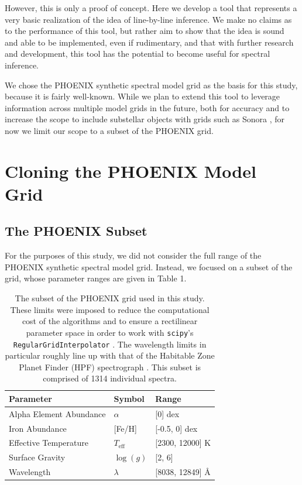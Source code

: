 \documentclass[twocolumn]{aastex631}
\begin{document}
However, this is only a proof of concept. Here we develop a tool that 
represents a very basic realization of the idea of line-by-line inference. 
We make no claims as to the performance of this tool, but rather aim to show 
that the idea is sound and able to be implemented, even if rudimentary, and 
that with further research and development, this tool has the potential to 
become useful for spectral inference.

We chose the PHOENIX synthetic spectral model grid as the basis for this 
study, because it is fairly well-known. While we plan to extend this tool to 
leverage information across multiple model grids in the future, both for 
accuracy and to increase the scope to include substellar objects with grids
such as Sonora \citep{bobcat, cholla, diamondback, elfowl}, for now we limit our scope to a subset of the PHOENIX grid.

\section{Cloning the PHOENIX Model Grid}
\subsection{The PHOENIX Subset}
For the purposes of this study, we did not consider the full range of the
PHOENIX synthetic spectral model grid. Instead, we focused on a subset of 
the grid, whose parameter ranges are given in Table 1.

\begin{table}[h!]
    \centering
    \begin{tabular}{lll}
        \hline
        \bf{Parameter} & \bf{Symbol} & \bf{Range}\\
        \hline
        Alpha Element Abundance & $\alpha$ & [0] dex\\
        Iron Abundance & [Fe/H] & [-0.5, 0] dex\\
        Effective Temperature & $T_{\mathrm{eff}}$ & [2300, 12000] K\\
        Surface Gravity & $\log(g)$ & [2, 6]\\
        Wavelength & $\lambda$ & [8038, 12849] \AA\\
        \hline
    \end{tabular}
    \caption{The subset of the PHOENIX grid used in this study. These limits 
    were imposed to reduce the computational cost of the algorithms and to 
    ensure a rectilinear parameter space in order to work with \texttt{scipy}'s
    \texttt{RegularGridInterpolator} \citep{scipy}. The wavelength limits in particular 
    roughly line up with that of the Habitable Zone Planet Finder (HPF) 
    spectrograph \citep{HPF}. This subset is comprised of 1314 individual spectra.}
\end{table}
\end{document}
